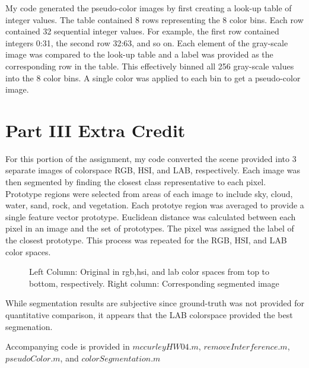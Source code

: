 \documentclass{article}[12 pt]
\begin{document}
\begin{enumerate}
My code generated the pseudo-color images by first creating a look-up table of  integer values.  The table contained 8 rows  representing the 8 color bins.  Each row contained 32 sequential integer values.  For example, the first row contained integers 0:31, the second row 32:63, and so on.  Each element of the gray-scale image was compared to the look-up table and a label was provided as the corresponding row in the table.   This effectively binned all 256 gray-scale values into the 8 color bins.  A single color was applied to each bin to get a pseudo-color image.
\end{enumerate}

\section*{Part III Extra Credit}
For this portion of the assignment, my code converted the scene provided into  3 separate images of colorspace RGB, HSI, and LAB, respectively. Each image was then segmented by finding the closest class representative to each pixel.  Prototype regions were selected from areas of each image to include sky, cloud, water, sand, rock, and vegetation.  Each prototye region was averaged to provide a single feature vector prototype.  Euclidean distance was calculated between each pixel in an image and the set of prototypes.  The pixel was assigned the label of the closest prototype.  This process was repeated for the RGB, HSI, and LAB color spaces.

\begin{figure}[H]
\captionsetup[subfloat]{labelformat=empty}
\centering
{}
\hspace{0mm}
\hspace{0mm}
\caption{Left Column: Original in rgb,hsi, and lab color spaces from top to bottom, respectively.  Right column: Corresponding segmented image}
\label{pc}
\end{figure}

\noindent
While segmentation results are subjective since ground-truth was not provided for quantitative comparison, it appears that the LAB colorspace provided the best segmenation. 

 \noindent 
 Accompanying code is provided in $mccurleyHW04.m$, $removeInterference.m$, $pseudoColor.m$, and $colorSegmentation.m$
\end{document}

